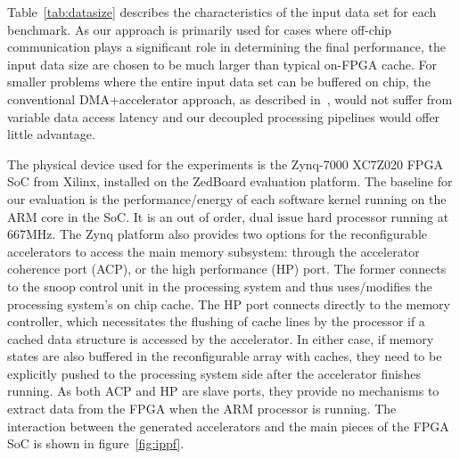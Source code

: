 Table~\ref{tab:datasize} describes the characteristics of the input data set for each
benchmark. 
As our approach is primarily used for cases where off-chip communication plays a
significant role in determining the final performance, the input data size are chosen
to be much larger than typical on-FPGA cache. For smaller problems where the
entire input data set can be buffered on chip, the conventional DMA+accelerator approach,
as described in~\cite{vivado_hls:appnoteMMult}, would not suffer from variable data access
latency and our decoupled processing pipelines would offer little advantage.



The physical device used for the experiments is the Zynq-7000 XC7Z020 FPGA
SoC from Xilinx, installed on the ZedBoard evaluation platform. The baseline 
for our evaluation is the performance/energy of each software kernel running
on the ARM core in the SoC. It is an out of order, dual issue hard
processor running at 667MHz. The Zynq platform also provides two
options for the reconfigurable accelerators to access the main memory subsystem: 
through the accelerator coherence port (ACP), or the high performance (HP) port. 
The former connects to the snoop control unit in the processing system and 
thus uses/modifies the processing system's on chip cache. The HP port connects
directly to the memory controller, which necessitates the flushing of cache lines 
by the processor if a cached data structure is accessed by the accelerator.
In either case, if memory states are also buffered in the reconfigurable array with caches, they 
need to be explicitly pushed to the processing system side after the accelerator finishes running. As both ACP
and HP are slave ports, they provide no mechanisms to extract data from the FPGA
when the ARM processor is running. The interaction between the generated accelerators
and the main pieces of the FPGA SoC is shown in figure~\ref{fig:ippf}.


